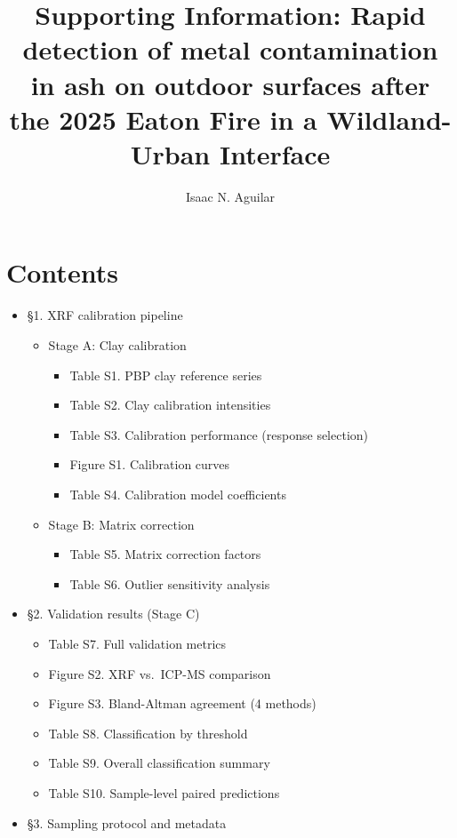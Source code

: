 \documentclass[journal=esthag,manuscript=suppinfo]{achemso}
\author{Isaac N. Aguilar}
\affiliation{Division of Geological and Planetary Sciences, California Institute of Technology, Pasadena, California, 91125}
\title{Supporting Information: Rapid detection of metal contamination in ash on outdoor surfaces after the 2025 Eaton Fire in a Wildland-Urban Interface}
\begin{document}

\section*{Contents}

\begin{itemize}
  \item \S 1. XRF calibration pipeline
  \begin{itemize}
    \item Stage A: Clay calibration
    \begin{itemize}
      \item Table S1. PBP clay reference series
      \item Table S2. Clay calibration intensities
      \item Table S3. Calibration performance (response selection)
      \item Figure S1. Calibration curves
      \item Table S4. Calibration model coefficients
    \end{itemize}
    \item Stage B: Matrix correction
    \begin{itemize}
      \item Table S5. Matrix correction factors
      \item Table S6. Outlier sensitivity analysis
    \end{itemize}
  \end{itemize}
  \item \S 2. Validation results (Stage C)
  \begin{itemize}
    \item Table S7. Full validation metrics
    \item Figure S2. XRF vs.\ ICP-MS comparison
    \item Figure S3. Bland-Altman agreement (4 methods)
    \item Table S8. Classification by threshold
    \item Table S9. Overall classification summary
    \item Table S10. Sample-level paired predictions
  \end{itemize}
  \item \S 3. Sampling protocol and metadata
  \begin{itemize}

\end{itemize}
\end{itemize}
\end{document}
